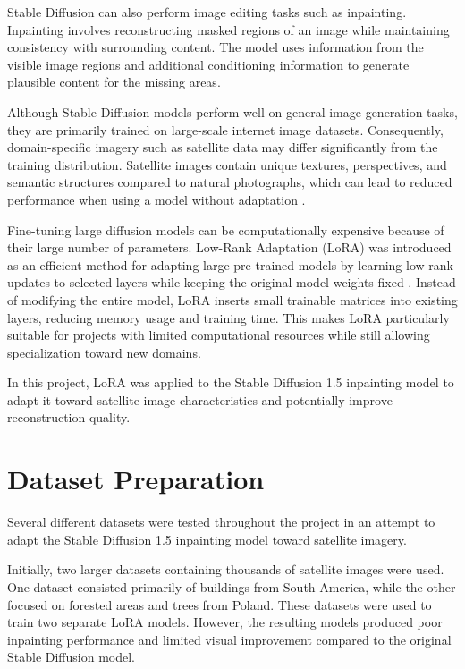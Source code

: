 \documentclass{article}
\begin{document}
Stable Diffusion can also perform image editing tasks such as inpainting. Inpainting involves reconstructing masked regions of an image while maintaining consistency with surrounding content. The model uses information from the visible image regions and additional conditioning information to generate plausible content for the missing areas.
\newline

Although Stable Diffusion models perform well on general image generation tasks, they are primarily trained on large-scale internet image datasets. Consequently, domain-specific imagery such as satellite data may differ significantly from the training distribution. Satellite images contain unique textures, perspectives, and semantic structures compared to natural photographs, which can lead to reduced performance when using a model without adaptation \citep{stablediffusiongithub}.
\newline

Fine-tuning large diffusion models can be computationally expensive because of their large number of parameters. Low-Rank Adaptation (LoRA) was introduced as an efficient method for adapting large pre-trained models by learning low-rank updates to selected layers while keeping the original model weights fixed \citep{hu2021lora}. Instead of modifying the entire model, LoRA inserts small trainable matrices into existing layers, reducing memory usage and training time. This makes LoRA particularly suitable for projects with limited computational resources while still allowing specialization toward new domains.

In this project, LoRA was applied to the Stable Diffusion 1.5 inpainting model to adapt it toward satellite image characteristics and potentially improve reconstruction quality.

\newpage
\section{Dataset Preparation}

Several different datasets were tested throughout the project in an attempt to adapt the Stable Diffusion 1.5 inpainting model toward satellite imagery.

Initially, two larger datasets containing thousands of satellite images were used. One dataset consisted primarily of buildings from South America, while the other focused on forested areas and trees from Poland. These datasets were used to train two separate LoRA models. However, the resulting models produced poor inpainting performance and limited visual improvement compared to the original Stable Diffusion model.
\newline
\end{document}
